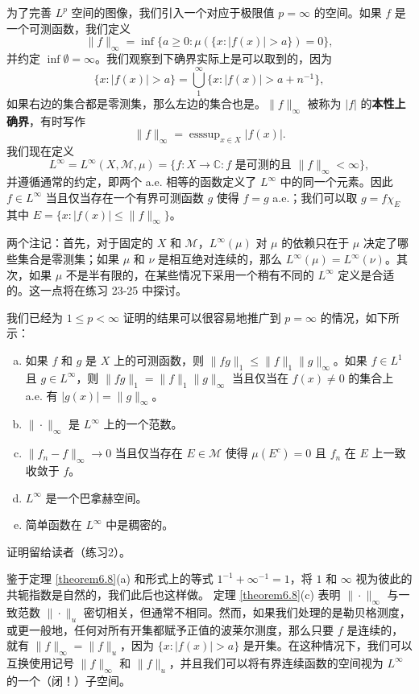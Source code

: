 \documentclass[lang=cn,10pt,thmcnt=section]{elegantbook}
\begin{document}
为了完善 $L^p$ 空间的图像，我们引入一个对应于极限值 $p=\infty$ 的空间。如果 $f$ 是一个可测函数，我们定义
\[ \|f\|_\infty = \inf\{a \ge 0 : \mu(\{x:|f(x)| > a\}) = 0\}, \]
并约定 $\inf\emptyset = \infty$。我们观察到下确界实际上是可以取到的，因为
\[ \{x: |f(x)| > a\} = \bigcup_1^\infty \{x: |f(x)| > a+n^{-1}\}, \]
如果右边的集合都是零测集，那么左边的集合也是。$\|f\|_\infty$ 被称为 $|f|$ 的\textbf{本性上确界}，有时写作
\[ \|f\|_\infty = \operatorname{ess sup}_{x \in X} |f(x)|. \]
我们现在定义
\[ L^\infty = L^\infty(X, \mathcal{M}, \mu) = \{ f: X \to \mathbb{C} : f \text{ 是可测的且 } \|f\|_\infty < \infty \}, \]
并遵循通常的约定，即两个 a.e. 相等的函数定义了 $L^\infty$ 中的同一个元素。因此 $f \in L^\infty$ 当且仅当存在一个有界可测函数 $g$ 使得 $f=g$ a.e.；我们可以取 $g=f\chi_E$ 其中 $E=\{x:|f(x)| \le \|f\|_\infty \}$。

两个注记：首先，对于固定的 $X$ 和 $\mathcal{M}$，$L^\infty(\mu)$ 对 $\mu$ 的依赖只在于 $\mu$ 决定了哪些集合是零测集；如果 $\mu$ 和 $\nu$ 是相互绝对连续的，那么 $L^\infty(\mu) = L^\infty(\nu)$。其次，如果 $\mu$ 不是半有限的，在某些情况下采用一个稍有不同的 $L^\infty$ 定义是合适的。这一点将在练习 23-25 中探讨。

我们已经为 $1 \le p < \infty$ 证明的结果可以很容易地推广到 $p=\infty$ 的情况，如下所示：

\begin{theorem}\label{theorem6.8}
\begin{enumerate}[(a)]
    \item 如果 $f$ 和 $g$ 是 $X$ 上的可测函数，则 $\|fg\|_1 \le \|f\|_1 \|g\|_\infty$。如果 $f \in L^1$ 且 $g \in L^\infty$，则 $\|fg\|_1 = \|f\|_1\|g\|_\infty$ 当且仅当在 $f(x) \ne 0$ 的集合上 a.e. 有 $|g(x)| = \|g\|_\infty$。
    \item $\|\cdot\|_\infty$ 是 $L^\infty$ 上的一个范数。
    \item $\|f_n - f\|_\infty \to 0$ 当且仅当存在 $E \in \mathcal{M}$ 使得 $\mu(E^c)=0$ 且 $f_n$ 在 $E$ 上一致收敛于 $f$。
    \item $L^\infty$ 是一个巴拿赫空间。
    \item 简单函数在 $L^\infty$ 中是稠密的。
\end{enumerate}
证明留给读者（练习2）。
\end{theorem}
鉴于定理 \ref{theorem6.8}(a) 和形式上的等式 $1^{-1}+\infty^{-1}=1$，将 $1$ 和 $\infty$ 视为彼此的共轭指数是自然的，我们此后也这样做。
定理 \ref{theorem6.8}(c) 表明 $\|\cdot\|_\infty$ 与一致范数 $\|\cdot\|_u$ 密切相关，但通常不相同。然而，如果我们处理的是勒贝格测度，或更一般地，任何对所有开集都赋予正值的波莱尔测度，那么只要 $f$ 是连续的，就有 $\|f\|_\infty = \|f\|_u$，因为 $\{x:|f(x)|>a\}$ 是开集。在这种情况下，我们可以互换使用记号 $\|f\|_\infty$ 和 $\|f\|_u$，并且我们可以将有界连续函数的空间视为 $L^\infty$ 的一个（闭！）子空间。
\end{document}
